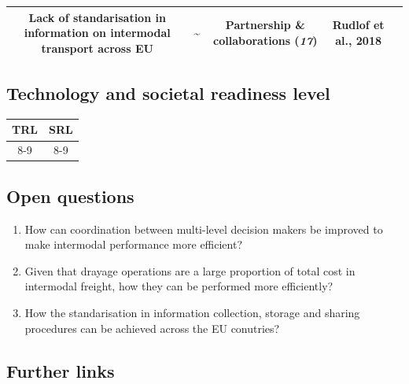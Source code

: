 \documentclass[
]{book}
\providecommand{\tightlist}{%
  \setlength{\itemsep}{0pt}\setlength{\parskip}{0pt}}
\begin{document}
\begin{longtable}[]{@{}ccccc@{}}
\begin{minipage}[t]{0.16\columnwidth}
Lack of standarisation in information on intermodal transport across EU\strut
\end{minipage} & \begin{minipage}[t]{0.17\columnwidth}\centering
\textbf{\textasciitilde{}}\strut
\end{minipage} & \begin{minipage}[t]{0.17\columnwidth}\centering
Partnership \& collaborations (\emph{17})\strut
\end{minipage} & \begin{minipage}[t]{0.17\columnwidth}\centering
Rudlof et al., 2018\strut
\end{minipage}\tabularnewline
\bottomrule
\end{longtable}

\hypertarget{technology-and-societal-readiness-level-19}{%
\subsection*{Technology and societal readiness level}\label{technology-and-societal-readiness-level-19}}

\begin{longtable}[]{@{}cc@{}}
\toprule
TRL & SRL\tabularnewline
\midrule
\endhead
8-9 & 8-9\tabularnewline
\bottomrule
\end{longtable}

\hypertarget{open-questions-19}{%
\subsection*{Open questions}\label{open-questions-19}}

\begin{enumerate}
\def\labelenumi{\arabic{enumi}.}
\tightlist
\item
  How can coordination between multi-level decision makers be improved to make intermodal performance more efficient?
\item
  Given that drayage operations are a large proportion of total cost in intermodal freight, how they can be performed more efficiently?
\item
  How the standarisation in information collection, storage and sharing procedures can be achieved across the EU conutries?
\end{enumerate}

\hypertarget{further-links-16}{%
\subsection*{Further links}\label{further-links-16}}
\end{document}

